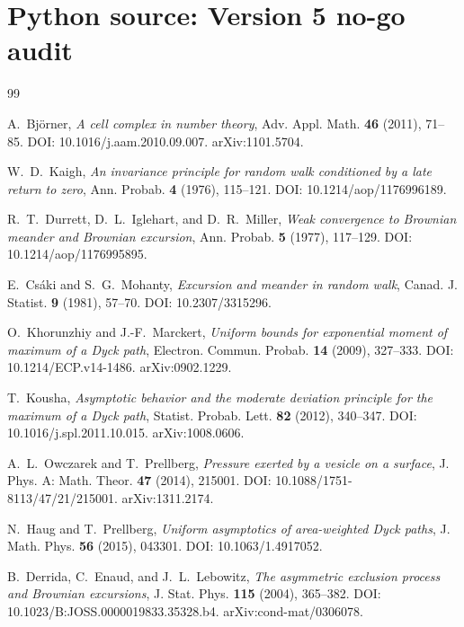 \documentclass[11pt]{amsart}
\numberwithin{equation}{section}
\theoremstyle{plain}
\theoremstyle{definition}
\theoremstyle{remark}
\begin{document}
\section{Python source: Version 5 no-go audit}


\begin{thebibliography}{99}

A.~Bj\"orner,
\emph{A cell complex in number theory},
Adv. Appl. Math. \textbf{46} (2011), 71--85.
DOI: 10.1016/j.aam.2010.09.007.
arXiv:1101.5704.

W.~D.~Kaigh,
\emph{An invariance principle for random walk conditioned by a late return to zero},
Ann. Probab. \textbf{4} (1976), 115--121.
DOI: 10.1214/aop/1176996189.

R.~T.~Durrett, D.~L.~Iglehart, and D.~R.~Miller,
\emph{Weak convergence to Brownian meander and Brownian excursion},
Ann. Probab. \textbf{5} (1977), 117--129.
DOI: 10.1214/aop/1176995895.

E.~Cs\'aki and S.~G.~Mohanty,
\emph{Excursion and meander in random walk},
Canad. J. Statist. \textbf{9} (1981), 57--70.
DOI: 10.2307/3315296.

O.~Khorunzhiy and J.-F.~Marckert,
\emph{Uniform bounds for exponential moment of maximum of a Dyck path},
Electron. Commun. Probab. \textbf{14} (2009), 327--333.
DOI: 10.1214/ECP.v14-1486.
arXiv:0902.1229.

T.~Kousha,
\emph{Asymptotic behavior and the moderate deviation principle for the maximum of a Dyck path},
Statist. Probab. Lett. \textbf{82} (2012), 340--347.
DOI: 10.1016/j.spl.2011.10.015.
arXiv:1008.0606.

A.~L.~Owczarek and T.~Prellberg,
\emph{Pressure exerted by a vesicle on a surface},
J. Phys. A: Math. Theor. \textbf{47} (2014), 215001.
DOI: 10.1088/1751-8113/47/21/215001.
arXiv:1311.2174.

N.~Haug and T.~Prellberg,
\emph{Uniform asymptotics of area-weighted Dyck paths},
J. Math. Phys. \textbf{56} (2015), 043301.
DOI: 10.1063/1.4917052.

B.~Derrida, C.~Enaud, and J.~L.~Lebowitz,
\emph{The asymmetric exclusion process and Brownian excursions},
J. Stat. Phys. \textbf{115} (2004), 365--382.
DOI: 10.1023/B:JOSS.0000019833.35328.b4.
arXiv:cond-mat/0306078.


\end{thebibliography}
\end{document}
